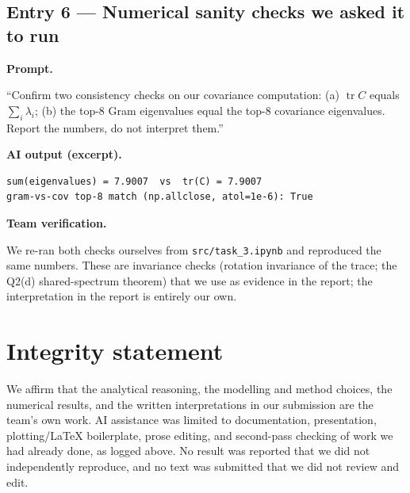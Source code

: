 \documentclass[11pt,a4paper]{article}
\DeclareMathOperator{\tr}{tr}
\newcommand{\logentry}[1]{\subsection*{#1}}
\begin{document}
\logentry{Entry 6 --- Numerical sanity checks we asked it to run}
\textbf{Prompt.}
\begin{promptbox}
``Confirm two consistency checks on our covariance computation: (a) $\tr C$ equals
$\sum_i\lambda_i$; (b) the top-8 Gram eigenvalues equal the top-8 covariance eigenvalues. Report
the numbers, do not interpret them.''
\end{promptbox}
\textbf{AI output (excerpt).}
\begin{outbox}
\begin{lstlisting}
sum(eigenvalues) = 7.9007  vs  tr(C) = 7.9007
gram-vs-cov top-8 match (np.allclose, atol=1e-6): True
\end{lstlisting}
\end{outbox}
\textbf{Team verification.}
\begin{verbox}
We re-ran both checks ourselves from \texttt{src/task\_3.ipynb} and reproduced the same numbers.
These are invariance checks (rotation invariance of the trace; the Q2(d) shared-spectrum theorem)
that we use as evidence in the report; the interpretation in the report is entirely our own.
\end{verbox}

\section{Integrity statement}
We affirm that the analytical reasoning, the modelling and method choices, the numerical results,
and the written interpretations in our submission are the team's own work. AI assistance was
limited to documentation, presentation, plotting/\LaTeX{} boilerplate, prose editing, and
second-pass checking of work we had already done, as logged above. No result was reported that we
did not independently reproduce, and no text was submitted that we did not review and edit.
\end{document}
